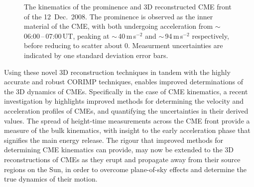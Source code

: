 \documentclass[preprint2]{aastex}
\begin{document}
\begin{figure}[t]
\caption{The kinematics of the prominence and 3D reconstructed CME front of the 12~Dec.~2008. The prominence is observed as the inner material of the CME, with both undergoing acceleration from $\sim$\,06:00\,--\,07:00\,UT, peaking at $\sim$\,40\,m\,s$^{-2}$ and $\sim$\,94\,m\,s$^{-2}$ respectively, before reducing to scatter about 0. Measurment uncertainties are indicated by one standard deviation error bars.}
\label{12dec2008kins}
\end{figure}

Using these novel 3D reconstruction techniques in tandem with the highly accurate and robust CORIMP techniques, enables improved determinations of the 3D dynamics of CMEs. Specifically in the case of CME kinematics, a recent investigation by \citet{2013A&A...557A..96B} highlights improved methods for determining the velocity and acceleration profiles of CMEs, and quantifying the uncertainties in their derived values. The spread of height-time measurements across the CME front provide a measure of the bulk kinematics, with insight to the early acceleration phase that signifies the main energy release. The rigour that improved methods for determining CME kinematics can provide, may now be extended to the 3D reconstructions of CMEs as they erupt and propagate away from their source regions on the Sun, in order to overcome plane-of-sky effects and determine the true dynamics of their motion.
\end{document}
